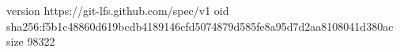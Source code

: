 version https://git-lfs.github.com/spec/v1
oid sha256:f5b1c48860d619bcdb4189146cfd5074879d585fe8a95d7d2aa8108041d380ac
size 98322
